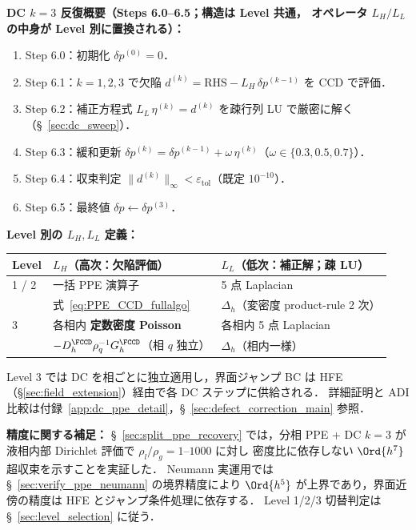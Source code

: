 \begin{tcolorbox}[algbox, title={1 タイムステップ $t^n \to t^{n+1}$ の完全アルゴリズム}]
\noindent\textbf{DC $k{=}3$ 反復概要（Steps 6.0--6.5；構造は Level 共通，
オペレータ $L_H/L_L$ の中身が Level 別に置換される）：}
\begin{enumerate}[leftmargin=2em,noitemsep]
  \item Step 6.0：初期化 $\delta p^{(0)} = 0$．
  \item Step 6.1：$k=1,2,3$ で欠陥 $d^{(k)} = \text{RHS} - L_H\,\delta p^{(k-1)}$ を CCD で評価．
  \item Step 6.2：補正方程式 $L_L\,\eta^{(k)} = d^{(k)}$ を疎行列 LU で厳密に解く（§~\ref{sec:dc_sweep}）．
  \item Step 6.3：緩和更新 $\delta p^{(k)} = \delta p^{(k-1)} + \omega\,\eta^{(k)}$（$\omega \in \{0.3,0.5,0.7\}$）．
  \item Step 6.4：収束判定 $\|d^{(k)}\|_\infty < \varepsilon_\mathrm{tol}$（既定 $10^{-10}$）．
  \item Step 6.5：最終値 $\delta p \leftarrow \delta p^{(3)}$．
\end{enumerate}

\noindent\textbf{Level 別の $L_H, L_L$ 定義：}
\begin{center}
\renewcommand{\arraystretch}{1.3}
\begin{tabular}{@{}lll@{}}
\hline
Level & $L_H$（高次：欠陥評価） & $L_L$（低次：補正解；疎 LU） \\
\hline
1 / 2 & 一括 PPE 演算子 & 5 点 Laplacian \\
 & 式~\eqref{eq:PPE_CCD_fullalgo} & $\Delta_h$（変密度 product-rule 2 次） \\
3 & 各相内 \textbf{定数密度 Poisson} & 各相内 5 点 Laplacian \\
 & $-D_h^\FCCD\rho_q^{-1}G_h^\FCCD$（相 $q$ 独立） & $\Delta_h$（相内一様） \\
\hline
\end{tabular}
\end{center}
Level 3 では DC を相ごとに独立適用し，界面ジャンプ BC は HFE
（§\ref{sec:field_extension}）経由で各 DC ステップに供給される．
詳細証明と ADI 比較は付録~\ref{app:dc_ppe_detail}，§~\ref{sec:defect_correction_main} 参照．

\noindent\textbf{精度に関する補足：}
§~\ref{sec:split_ppe_recovery} では，分相 PPE + DC $k{=}3$ が
液相内部 Dirichlet 評価で $\rho_l/\rho_g = 1$--$1000$ に対し
密度比に依存しない $\Ord{h^7}$ 超収束を示すことを実証した．
Neumann 実運用では §~\ref{sec:verify_ppe_neumann} の境界精度により
$\Ord{h^5}$ が上界であり，界面近傍の精度は HFE とジャンプ条件処理に依存する．
Level 1/2/3 切替判定は §~\ref{sec:level_selection} に従う．


\end{tcolorbox}
